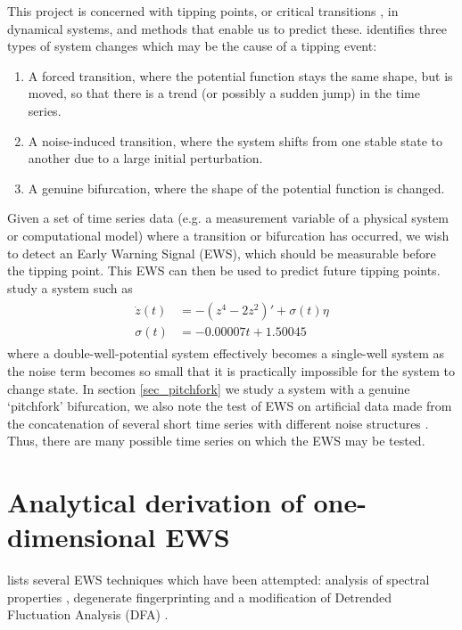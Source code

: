 \documentclass[11pt,a4paper,reqno]{article}
\numberwithin{equation}{section}
\begin{document}
This project is concerned with tipping points, or critical transitions \citep{lenton2008, scheffer2009}, in dynamical systems, and methods that enable us to predict these. \cite{livina2011} identifies three types of system changes which may be the cause of a tipping event:
\begin{enumerate}
\item A forced transition, where the potential function stays the same shape, but is moved, so that there is a trend (or possibly a sudden jump) in the time series.
\item A noise-induced transition, where the system shifts from one stable state to another due to a large initial perturbation.
\item A genuine bifurcation, where the shape of the potential function is changed. 
\end{enumerate}
Given a set of time series data (e.g. a measurement variable of a physical system or computational model) where a transition or bifurcation has occurred, we wish to detect an Early Warning Signal (EWS), which should be measurable before the tipping point. This EWS can then be used to predict future tipping points.\\

\cite{livina2011} study a system such as
\begin{align}
\begin{split}
\label{noise_wells}
\dot{z}(t) & = -(z^4 - 2z^2)' + \sigma(t)\eta \\
\sigma(t) & = -0.00007t+1.50045
\end{split}
\end{align}
where a double-well-potential system effectively becomes a single-well system as the noise term becomes so small that it is practically impossible for the system to change state. In section \ref{sec_pitchfork} we study a system with a genuine `pitchfork' bifurcation, we also note the test of EWS on artificial data made from the concatenation of several short time series with different noise structures \citep{livina2012}. Thus, there are many possible time series on which the EWS may be tested.

\section{Analytical derivation of one-dimensional EWS}
\label{sec_EWS_methods}

\cite{dakos2008} lists several EWS techniques which have been attempted: analysis of spectral properties \citep{kleinen2003}, degenerate fingerprinting \citep{held2004} and a modification of Detrended Fluctuation Analysis (DFA) \citep{livina2007}.\\
\end{document}
